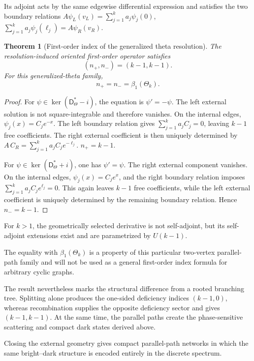 \documentclass[11pt]{article}
\theoremstyle{plain}
\newtheorem{theorem}{Theorem}[section]
\theoremstyle{definition}
\begin{document}
Its adjoint acts by the same edgewise differential expression and satisfies
the two boundary relations
\(A\psi_L(v_L) = \sum_{j=1}^{k}a_j\psi_j(0)\),
\(\sum_{j=1}^{k}a_j\psi_j(\ell_j) = A\psi_R(v_R)\).

\begin{theorem}[First-order index of the generalized theta resolution]
\label{thm:split-rejoin-deficiency}
The resolution-induced oriented first-order operator satisfies
\[
  (n_+,n_-)
  =
  (k-1,k-1).
\]
For this generalized-theta family,
\[
  n_+=n_-=\beta_1(\Theta_k).
\]
\end{theorem}

\begin{proof}
For
\(\psi\in\ker(\mathsf D_\Theta^*-i)\),
the equation is
\(\psi'=-\psi\).
The left external solution is not square-integrable and therefore vanishes.
On the internal edges,
\(\psi_j(x)=C_je^{-x}\).
The left boundary relation gives
\(\sum_{j=1}^{k}a_jC_j=0\),
leaving \(k-1\) free coefficients. The right external coefficient is then
uniquely determined by
\(A\,C_R = \sum_{j=1}^{k} a_jC_je^{-\ell_j}\).
\(n_+=k-1\).

For
\(\psi\in\ker(\mathsf D_\Theta^*+i)\),
one has
\(\psi'=\psi\).
The right external component vanishes. On the internal edges,
\(\psi_j(x)=C_je^x\),
and the right boundary relation imposes
\(\sum_{j=1}^{k} a_jC_je^{\ell_j}=0\).
This again leaves \(k-1\) free coefficients, while the left external
coefficient is uniquely determined by the remaining boundary relation.
Hence
\(n_-=k-1\).
\end{proof}

For \(k>1\), the geometrically selected derivative is not self-adjoint, but
its self-adjoint extensions exist and are parametrized by
\(U(k-1)\).

The equality with \(\beta_1(\Theta_k)\) is a property of this particular
two-vertex parallel-path family and will not be used as a general
first-order index formula for arbitrary cyclic graphs.

The result nevertheless marks the structural difference from a rooted
branching tree. Splitting alone produces the one-sided deficiency indices
\((k-1,0)\), whereas recombination supplies the opposite deficiency sector
and gives \((k-1,k-1)\). At the same time, the parallel paths create the
phase-sensitive scattering and compact dark states derived above.

Closing the external geometry gives compact parallel-path networks in which
the same bright--dark structure is encoded entirely in the discrete spectrum.
\end{document}

